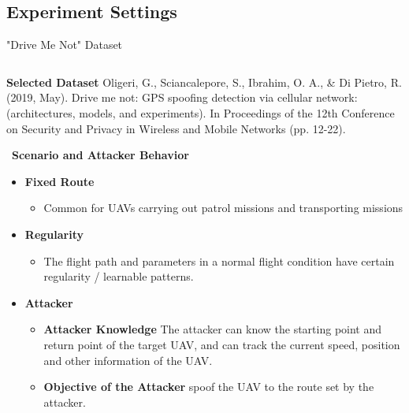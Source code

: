 \documentclass[aspectratio=169, 8pt]{beamer}
\begin{document}
\subsection{Experiment Settings}

\begin{frame}{"Drive Me Not" Dataset}
    \begin{columns}[T]
        \begin{column}{0.5\linewidth}
            {\small \textbf{Selected Dataset}}
               {\tiny Oligeri, G., Sciancalepore, S., Ibrahim, O. A., \& Di Pietro, R. (2019, May). Drive me not: GPS spoofing detection via cellular network: (architectures, models, and experiments). In Proceedings of the 12th Conference on Security and Privacy in Wireless and Mobile Networks (pp. 12-22).}
                
            \vspace{0.5cm}

            \
            \textbf{Scenario and Attacker Behavior}
            
            \begin{itemize}
                \item \textbf{Fixed Route}
                \begin{itemize}
                    \item Common for UAVs carrying out patrol missions and transporting missions
                \end{itemize}
                \item \textbf{Regularity}
                \begin{itemize}
                    \item The ﬂight path and parameters in a normal ﬂight condition have certain regularity / learnable patterns.
                \end{itemize}
                \item \textbf{Attacker}
                \begin{itemize}
                    \item \textbf{Attacker Knowledge} The attacker can know the starting point and return point of the target UAV, and can track the current speed, position and other information of the UAV. 
                    \item \textbf{Objective of the Attacker} spoof the UAV to the route set by the attacker.
                \end{itemize}
               

\end{itemize}
\end{column}
\end{columns}
\end{frame}
\end{document}
